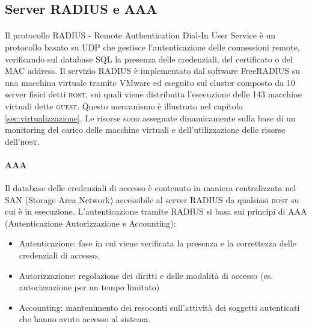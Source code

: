 \subsection{Server RADIUS e AAA}
\label{subsec:radius}
\paragraph{} Il protocollo RADIUS - Remote Authentication Dial-In User Service è un protocollo basato su UDP che gestisce l'autenticazione delle connessioni remote, verificando sul database SQL la presenza delle credenziali, del certificato o del MAC address. Il servizio RADIUS è implementato dal software FreeRADIUS su una macchina virtuale tramite VMware ed eseguito sul cluster composto da 10 server fisici detti \textsc{host}, sui quali viene distribuita l'esecuzione delle 143 macchine virtuali dette \textsc{guest}. Questo meccanismo è illustrato nel capitolo \ref{sec:virtualizzazione}. Le risorse sono assegnate dinamicamente sulla base di un monitoring del carico delle macchine virtuali e dell’utilizzazione delle risorse dell'\textsc{host}.


\paragraph{AAA} Il database delle credenziali di accesso è contenuto in maniera centralizzata nel SAN (Storage Area Network) accessibile al server RADIUS da qualsiasi \textsc{host} su cui è in esecuzione.
L'autenticazione tramite RADIUS si basa sui principi di AAA (Autenticazione Autorizzazione e Accounting):
\begin{itemize}
    \item Autenticazione: fase in cui viene verificata la presenza e la correttezza delle credenziali di accesso. 
    \item Autorizzazione: regolazione dei diritti e delle modalità di accesso (es. autorizzazione per un tempo limitato)
    \item Accounting: mantenimento dei resoconti sull'attività dei soggetti autenticati che hanno avuto accesso al sistema.
\end{itemize}

